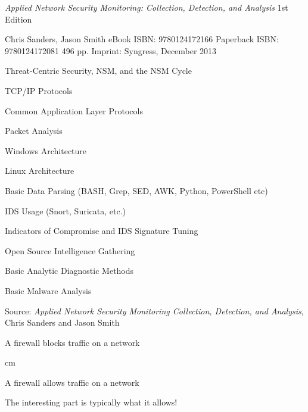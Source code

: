\documentclass[Screen16to9,17pt]{foils}
\begin{document}


\emph{Applied Network Security Monitoring: Collection, Detection, and Analysis}
1st Edition

Chris Sanders, Jason Smith
eBook ISBN: 9780124172166
Paperback ISBN: 9780124172081 496 pp.
Imprint: Syngress, December 2013




\begin{list2}\small
\item Threat-Centric Security, NSM, and the NSM Cycle
\item TCP/IP Protocols
\item Common Application Layer Protocols
\item Packet Analysis
\item Windows Architecture
\item Linux Architecture
\item Basic Data Parsing (BASH, Grep, SED, AWK, Python, PowerShell etc)
\item IDS Usage (Snort, Suricata, etc.)
\item Indicators of Compromise and IDS Signature Tuning
\item Open Source Intelligence Gathering
\item Basic Analytic Diagnostic Methods
\item Basic Malware Analysis
\end{list2}

Source: \emph{Applied Network Security Monitoring Collection, Detection, and Analysis},\\
Chris Sanders and Jason Smith










\centerline{\hlkbig A firewall {\color{security6blue}blocks traffic} on a network}

 cm
\pause

\centerline{\hlkbig A firewall {\color{red}allows traffic} on a network}
{\small The interesting part is typically what it allows!}
\end{document}
